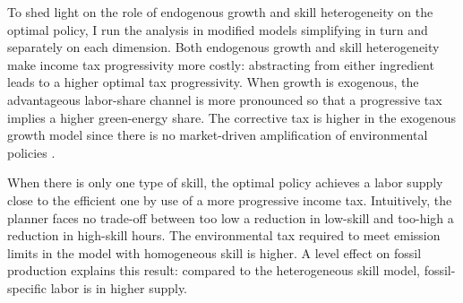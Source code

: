  




To shed light on the role of endogenous growth and skill heterogeneity on the optimal policy, I run the analysis in modified models simplifying in turn and separately on each dimension. 
Both endogenous growth and skill heterogeneity make income tax progressivity more costly: abstracting from either ingredient leads to a higher optimal tax progressivity. 
When growth is exogenous, the advantageous labor-share channel is more pronounced so that a progressive tax implies a higher green-energy share. The corrective tax is higher in the exogenous growth model since there is no market-driven amplification of environmental policies \citep[a finding stressed in ][]{Fried2018ClimateAnalysis}. 

When there is only one type of skill, the optimal policy achieves a labor supply close to the efficient one by use of a more progressive income tax. Intuitively, the planner faces no trade-off between too low a reduction in low-skill and too-high a reduction in high-skill hours.
The environmental tax required to meet emission limits in the model with homogeneous skill is higher. A level effect on fossil production  explains this result: compared to the heterogeneous skill model, fossil-specific labor is in higher supply.%

